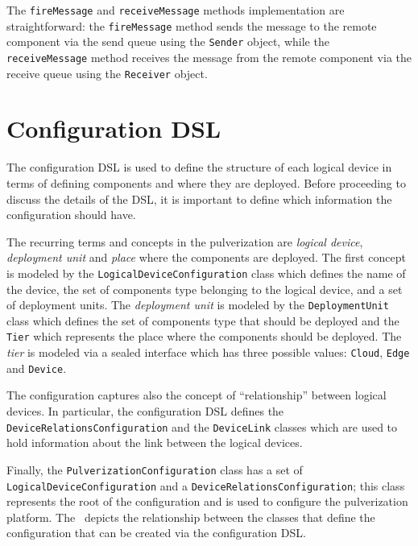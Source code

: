 The \texttt{fireMessage} and \texttt{receiveMessage} methods implementation are straightforward: the \texttt{fireMessage} method sends the message
to the remote component via the send queue using the \texttt{Sender} object, while the \texttt{receiveMessage} method receives the message from the
remote component via the receive queue using the \texttt{Receiver} object.


\section{Configuration DSL}
\label{sec:configuration-dsl-impl}


The configuration DSL is used to define the structure of each logical device in terms of defining components and where they are deployed.
Before proceeding to discuss the details of the DSL, it is important to define which information the configuration should have.

The recurring terms and concepts in the pulverization are \emph{logical device}, \emph{deployment unit} and \emph{place} where the components are
deployed. The first concept is modeled by the \texttt{LogicalDeviceConfiguration} class which defines the name of the device, the set of components
type belonging to the logical device, and a set of deployment units.
The \emph{deployment unit} is modeled by the \texttt{DeploymentUnit} class which defines the set of components type that should be deployed and the
\texttt{Tier} which represents the place where the components should be deployed. The \emph{tier} is modeled via a sealed interface which has
three possible values: \texttt{Cloud}, \texttt{Edge} and \texttt{Device}.

The configuration captures also the concept of ``relationship'' between logical devices. In particular, the configuration DSL defines
the \texttt{Device\-Relations\-Configuration} and the \texttt{DeviceLink} classes which are used to hold information about the link between the logical devices.

Finally, the \texttt{PulverizationConfiguration} class has a set of \texttt{Logical\-Device\-Configuration} and a
\texttt{DeviceRelationsConfiguration}; this class represents the root of the configuration and is used to configure the pulverization platform.
The~ depicts the relationship between the classes that define the configuration that can be created via the
configuration DSL.

